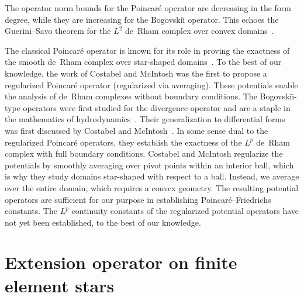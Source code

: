 \documentclass[12pt,a4paper]{article}
\begin{document}

\begin{remark}
    The operator norm bounds for the Poincar\'e operator are decreasing in the form degree,
    while they are increasing for the Bogovski\u{\i} operator.
    This echoes the Guerini--Savo theorem for the $L^{2}$ de~Rham complex over convex domains~\cite{guerini2004eigenvalue}.
\end{remark}

\begin{remark}
    The classical Poincar\'e operator is known for its role in proving the exactness of the smooth de~Rham complex over star-shaped domains~\cite{lee2012smooth}.
    To the best of our knowledge, the work of Costabel and McIntosh was the first to propose a regularized Poincar\'e operator (regularized via averaging).
    These potentials enable the analysis of de~Rham complexes without boundary conditions.
    The Bogovski\u{\i}-type operators were first studied for the divergence operator and are a staple in the mathematics of hydrodynamics~\cite{bogovskii1979solution}.
    Their generalization to differential forms was first discussed by Costabel and McIntosh~\cite{costabel2010bogovskiui}. 
    In some sense dual to the regularized Poincar\'e operators, they establish the exactness of the $L^{p}$ de~Rham complex with full boundary conditions.
    Costabel and McIntosh regularize the potentials by smoothly averaging over pivot points within an interior ball, 
    which is why they study domains star-shaped with respect to a ball. 
    Instead, we average over the entire domain, which requires a convex geometry. 
    The resulting potential operators are sufficient for our purpose in establishing Poincar\'e--Friedrichs constants. 
    The $L^{p}$ continuity constants of the regularized potential operators have not yet been established, to the best of our knowledge.
\end{remark}













\section{Extension operator on finite element stars}\label{section:extension}
\end{document}

